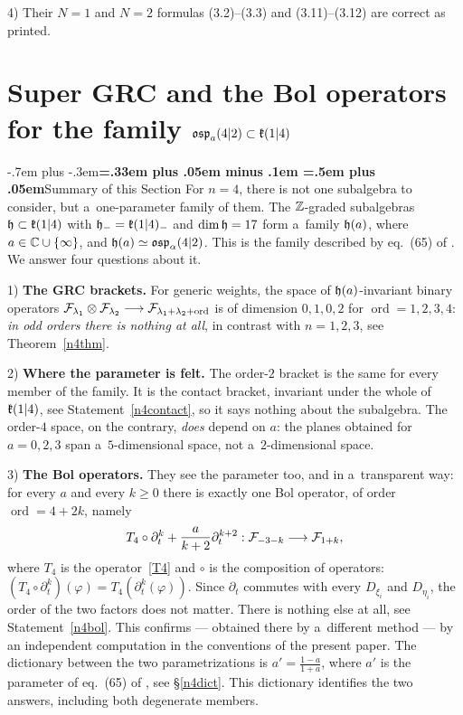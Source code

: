 \documentclass[12pt,a4paper]{amsart}
\makeatletter
\providecommand{\headspaces}{\spaceskip=.33em plus .05em minus .1em \xspaceskip=.5em plus .05em}
\def\subsection{\@startsection{subsection}{2}{0pt}{-1ex \@plus -.4ex \@minus -.2ex}%
  {-.7em plus -.3em}{\normalfont\normalsize\bfseries\boldmath\headspaces}}
\theoremstyle{thm}
\theoremstyle{definition}
\let\ssec\subsection
\newcommand {\tp}{\otimes}
\newcommand {\Nord}{\operatorname{ord}}   %
\makeatother
\begin{document}
4) Their $N=1$ and $N=2$ formulas (3.2)--(3.3) and (3.11)--(3.12) are correct as printed.

\section{Super GRC and the Bol operators for the family ${\mathfrak{osp}}_a(4|2)\subset{\mathfrak{k}}(1|4)$
}\label{Sn4}

\ssec{Summary of this Section}\label{n4summary}
For $n=4$, there is not one subalgebra to consider, but a~one-parameter family of them. The
${\mathbb Z}$-graded subalgebras ${\mathfrak{h}}\subset{\mathfrak{k}}(1|4)$ with ${\mathfrak{h}}_-={\mathfrak{k}}(1|4)_-$ and $\dim{\mathfrak{h}}=17$ form
a~family ${\mathfrak{h}}(a)$, where $a\in{\mathbb C}\cup\{\infty\}$, and ${\mathfrak{h}}(a)\simeq{\mathfrak{osp}}_\alpha(4|2)$. This is the
family described by eq.~(65) of \cite{BLS1}. We answer four questions about it.

1) \textbf{The GRC brackets.} For generic weights, the space of ${\mathfrak{h}}(a)$-invariant binary
operators $\cF_{\lambda_1}\tp\cF_{\lambda_2}\tto\cF_{\lambda_1+\lambda_2+\Nord}$ is of dimension
$0,1,0,2$ for $\Nord=1,2,3,4$: \textit{in odd orders there is nothing at all}, in contrast with
$n=1,2,3$, see Theorem~\ref{n4thm}.

2) \textbf{Where the parameter is felt.} The order-$2$ bracket is the same for every
member of the family. It is the contact bracket, invariant under the whole of ${\mathfrak{k}}(1|4)$, see
Statement~\ref{n4contact}, so it says nothing about the subalgebra. The order-$4$ space, on the
contrary, \textit{does} depend on $a$: the planes obtained for $a=0,2,3$ span a~$5$-dimensional
space, not a~$2$-dimensional space.

3) \textbf{The Bol operators.} They see the parameter too, and in a~transparent way:
for every $a$ and every $k\geq0$ there is exactly one Bol operator, of order $\Nord=4+2k$, namely
\[
T_4\circ\partial_t^k+\frac{a}{k+2}\partial_t^{k+2}:\cF_{-3-k}\tto\cF_{1+k},
\]
where $T_4$ is the operator~\eqref{T4} and $\circ$ is the composition of operators\textup{:}
$(T_4\circ\partial_t^k)(\varphi)=T_4(\partial_t^k(\varphi))$. Since $\partial_t$ commutes with
every $D_{\xi_i}$ and $D_{\eta_i}$, the order of the two factors does not matter. There is
nothing else at all, see Statement~\ref{n4bol}. This confirms \cite[Thm~1.6]{BLS1} --- obtained
there by a~different method --- by an independent computation in the conventions of the present
paper. The dictionary between the two parametrizations is $a'=\frac{1-a}{1+a}$, where $a'$ is the parameter of eq.~(65) of \cite{BLS1}, see
\S\ref{n4dict}. This dictionary identifies the two answers, including both degenerate members.
\end{document}
